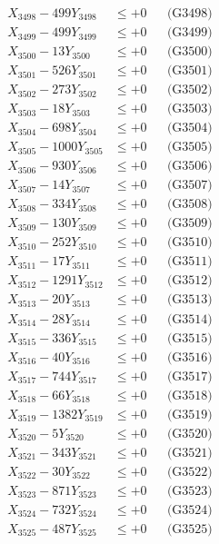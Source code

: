 \documentclass[a4paper,10pt]{article}
\begin{document}
{\begin{align}
X_{3498} - 499Y_{3498} &\leq +0 && \text{(G3498)} \\
X_{3499} - 499Y_{3499} &\leq +0 && \text{(G3499)} \\
X_{3500} - 13Y_{3500} &\leq +0 && \text{(G3500)} \\
\allowbreak
X_{3501} - 526Y_{3501} &\leq +0 && \text{(G3501)} \\
X_{3502} - 273Y_{3502} &\leq +0 && \text{(G3502)} \\
X_{3503} - 18Y_{3503} &\leq +0 && \text{(G3503)} \\
X_{3504} - 698Y_{3504} &\leq +0 && \text{(G3504)} \\
X_{3505} - 1000Y_{3505} &\leq +0 && \text{(G3505)} \\
X_{3506} - 930Y_{3506} &\leq +0 && \text{(G3506)} \\
X_{3507} - 14Y_{3507} &\leq +0 && \text{(G3507)} \\
X_{3508} - 334Y_{3508} &\leq +0 && \text{(G3508)} \\
X_{3509} - 130Y_{3509} &\leq +0 && \text{(G3509)} \\
X_{3510} - 252Y_{3510} &\leq +0 && \text{(G3510)} \\
\allowbreak
X_{3511} - 17Y_{3511} &\leq +0 && \text{(G3511)} \\
X_{3512} - 1291Y_{3512} &\leq +0 && \text{(G3512)} \\
X_{3513} - 20Y_{3513} &\leq +0 && \text{(G3513)} \\
X_{3514} - 28Y_{3514} &\leq +0 && \text{(G3514)} \\
X_{3515} - 336Y_{3515} &\leq +0 && \text{(G3515)} \\
X_{3516} - 40Y_{3516} &\leq +0 && \text{(G3516)} \\
X_{3517} - 744Y_{3517} &\leq +0 && \text{(G3517)} \\
X_{3518} - 66Y_{3518} &\leq +0 && \text{(G3518)} \\
X_{3519} - 1382Y_{3519} &\leq +0 && \text{(G3519)} \\
X_{3520} - 5Y_{3520} &\leq +0 && \text{(G3520)} \\
\allowbreak
X_{3521} - 343Y_{3521} &\leq +0 && \text{(G3521)} \\
X_{3522} - 30Y_{3522} &\leq +0 && \text{(G3522)} \\
X_{3523} - 871Y_{3523} &\leq +0 && \text{(G3523)} \\
X_{3524} - 732Y_{3524} &\leq +0 && \text{(G3524)} \\
X_{3525} - 487Y_{3525} &\leq +0 && \text{(G3525)} \\

\end{align}}
\end{document}
